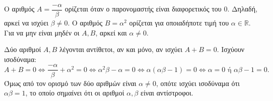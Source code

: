 
\begin{alist}
\item Ο αριθμός $A = \dfrac{-\alpha}{\beta}$ ορίζεται όταν ο παρονομαστής είναι διαφορετικός του $0$. Δηλαδή, αρκεί
να ισχύει $\beta \ne 0$.
Ο αριθμός $B = \alpha^2$ ορίζεται για οποιαδήποτε τιμή του $\alpha \in \mathbb{R}$.
Για να μην είναι μηδέν οι $A, B$, αρκεί και $\alpha \ne 0$.

\item Δύο αριθμοί $A, B$ λέγονται αντίθετοι, αν και μόνο, αν ισχύει $A + B = 0$.
Ισχύουν ισοδύναμα:
\[A + B = 0 \Leftrightarrow \dfrac{-\alpha}{\beta} + \alpha^2 = 0 \Leftrightarrow \alpha^2\beta - \alpha = 0 \Leftrightarrow \alpha(\alpha\beta - 1) = 0 \Leftrightarrow \alpha = 0 \text{ ή } \alpha\beta - 1 = 0.\]
Όμως από τον ορισμό των δύο αριθμών είναι $\alpha \ne 0$, οπότε ισχύει ισοδύναμα ότι $\alpha\beta = 1$, το
οποίο σημαίνει ότι οι αριθμοί $\alpha, \beta$ είναι αντίστροφοι.
\end{alist}

